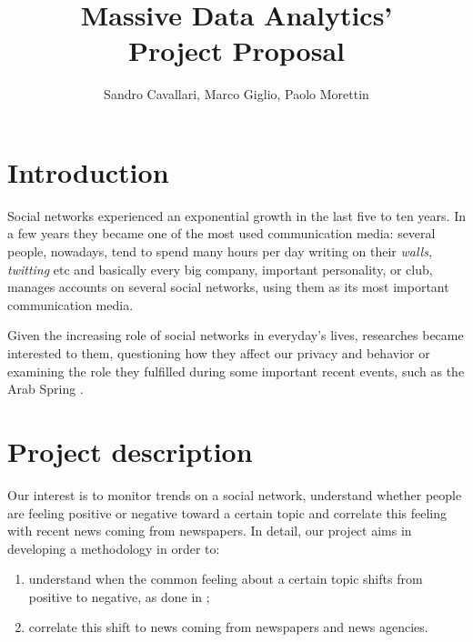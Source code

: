 \documentclass[a4paper]{article}
\begin{document}
\title{Massive Data Analytics'\\Project Proposal}
\author{Sandro Cavallari, Marco Giglio, Paolo Morettin}
\maketitle

\section{Introduction}
Social networks experienced an exponential growth in the last five to ten years.
In a few years they became one of the most used communication media:
several people, nowadays, tend to spend many hours per day writing on their
\emph{walls}, \emph{twitting} etc and basically every big company, important
personality, or club, manages accounts on several social networks, using them as
its most important communication media.

Given the increasing role of social networks in everyday's lives, researches
became interested to them, questioning how they affect our privacy and behavior
\cite{Debatin}\cite{Acar} or examining the role they fulfilled during some
important recent events, such as the Arab Spring \cite{Howard}\cite{Lotan}.

\section{Project description}
Our interest is to monitor trends on a social network, understand whether people
are feeling positive or negative toward a certain topic and correlate this
feeling with recent news coming from newspapers. In detail, our project aims in
developing a methodology in order to:
\begin{enumerate}
\item understand when the common feeling about a certain topic shifts from positive
to negative, as done in \cite{Bifet};
\item correlate this shift to news coming from newspapers and news agencies.
\end{enumerate}
\end{document}
